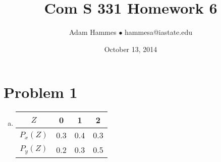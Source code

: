\documentclass[11pt]{article}
\begin{document}
\title{Com S 331 Homework 6}
\author{Adam Hammes $\bullet$ hammesa@iastate.edu}
\date{October 13, 2014}
\maketitle

\section*{Problem 1}
\begin{enumerate}[(a)]
\item
	\begin{tabular}{ c | c c c}
		$Z$	& 0 & 1 & 2 \\
		\hline
		$P_x(Z)$ & 0.3 & 0.4 & 0.3 \\
		$P_y(Z)$ & 0.2 & 0.3 & 0.5
	\end{tabular}


\end{enumerate}
\end{document}
